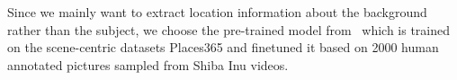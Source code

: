 Since we mainly want to extract location information about the background 
rather than the subject, we choose the pre-trained model 
from~\cite{zhou2017places} which is trained on the scene-centric datasets 
Places365 and finetuned it based on 2000 human annotated pictures sampled 
from Shiba Inu videos. 




